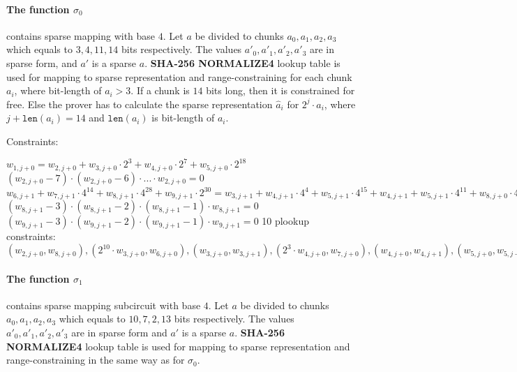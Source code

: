 \paragraph{The function $\sigma_0$} contains sparse mapping with base $4$.
Let $a$ be divided to chunks $a_0, a_1, a_2, a_3$ which equals to $3, 4, 11, 14$ bits respectively.
The values $a'_0, a'_1, a'_2, a'_3$ are in sparse form, and $a'$ is a sparse $a$.
\textbf{SHA-256 NORMALIZE4} lookup table is used for mapping to sparse representation and range-constraining for each chunk $a_i$, where bit-length of $a_i > 3$.
If a chunk is $14$ bits long, then it is constrained for free.
Else the prover has to calculate the sparse representation $\hat{a}_i$ for $2^j \cdot a_i$, where $j + \texttt{len}(a_i) = 14$ and $\texttt{len}(a_i)$ is bit-length of $a_i$.

Constraints:
\begin{center}
    $w_{1, j + 0} = w_{2, j + 0} + w_{3,j + 0} \cdot 2^3 + w_{4,j + 0} \cdot 2^{7} + w_{5, j + 0} \cdot 2^{18}$ \\
    $(w_{2, j + 0} - 7) \cdot (w_{2, j + 0} - 6) \cdot ... \cdot w_{2, j + 0} = 0$ \\
    $w_{6, j + 1} + w_{7, j + 1} \cdot 4^{14} + w_{8, j + 1} \cdot 4^{28} + w_{9, j + 1} \cdot 2^{30} = w_{3, j + 1} + w_{4, j + 1} \cdot 4^{4} + w_{5, j + 1} \cdot 4^{15} + w_{4, j + 1} + w_{5, j + 1} \cdot 4^{11} + w_{8, j + 0} \cdot 4^{25} + w_{3, j + 1} \cdot 4^{28} + w_{5, j + 1} + w_{8, j + 0} \cdot 4^{14}+ w_{3, j + 1} \cdot 4^{17} + w_{4, j + 1} \cdot 4^{21}$ \\
    $(w_{8, j + 1} - 3) \cdot (w_{8, j + 1} - 2) \cdot (w_{8, j + 1} - 1) \cdot w_{8, j + 1} = 0$
    $(w_{9, j + 1} - 3) \cdot (w_{9, j + 1} - 2) \cdot (w_{9, j + 1} - 1) \cdot w_{9, j + 1} = 0$
    10 plookup constraints: $(w_{2, j + 0}, w_{8, j + 0}), ( 2^{10} \cdot w_{3, j + 0}, w_{6, j + 0}), (w_{3, j + 0}, w_{3, j + 1}), (2^3 \cdot w_{4, j + 0}, w_{7, j + 0}), (w_{4, j + 0}, w_{4, j + 1}), (w_{5, j + 0}, w_{5, j + 1}), (w_{2, j + 2}, w_{6, j + 1}), (w_{3, j + 2}, w_{7, j + 1}), (w_{4, j + 2}, w_{8, j + 2}), (w_{5, j + 2}, w_{9, j + 2})$ \\
\end{center}

\paragraph{The function $\sigma_1$} contains sparse mapping subcircuit with base $4$.
Let $a$ be divided to chunks $a_0, a_1, a_2, a_3$ which equals to $10, 7, 2, 13$ bits respectively.
The values $a'_0, a'_1, a'_2, a'_3$ are in sparse form and $a'$ is a sparse $a$.
\textbf{SHA-256 NORMALIZE4} lookup table is used for mapping to sparse representation and range-constraining in the same way as for $\sigma_0$.

